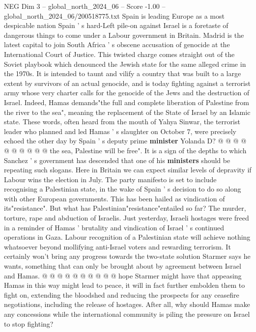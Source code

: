 \begin{textsample}{NEG Dim 3 – global\_north\_2024\_06 – Score -1.00 – global\_north\_2024\_06/200518775.txt}  \label{ex:f3_neg_394}
Spain is leading Europe as a most despicable nation Spain ' s hard-Left pile-on against Israel is a foretaste of dangerous things to come under a Labour government in Britain.
Madrid is the latest capital to join South Africa ' s obscene accusation of genocide at the International Court of Justice.
This twisted charge comes straight out of the Soviet playbook which denounced the Jewish state for the same alleged crime in the 1970s.
It is intended to taunt and vilify a country that was built to a large extent by survivors of an actual genocide, and is today fighting against a terrorist army whose very charter calls for the genocide of the Jews and the destruction of Israel.
Indeed, Hamas demands"the full and complete liberation of Palestine from the river to the sea", meaning the replacement of the State of Israel by an Islamic state.
These words, often heard from the mouth of Yahya Sinwar, the terrorist leader who planned and led Hamas ' s slaughter on October 7, were precisely echoed the other day by Spain ' s deputy prime \textbf{minister} Yolanda D? @ @ @ @ @ @ @ @ @ @ the sea, Palestine will be free".
It is a sign of the depths to which Sanchez ' s government has descended that one of his \textbf{ministers} should be repeating such slogans.
Here in Britain we can expect similar levels of depravity if Labour wins the election in July.
The party manifesto is set to include recognising a Palestinian state, in the wake of Spain ' s decision to do so along with other European governments.
This has been hailed as vindication of its"resistance".
But what has Palestinian"resistance"entailed so far?
The murder, torture, rape and abduction of Israelis.
Just yesterday, Israeli hostages were freed in a reminder of Hamas ' brutality and vindication of Israel ' s continued operations in Gaza.
Labour recognition of a Palestinian state will achieve nothing whatsoever beyond mollifying anti-Israel voters and rewarding terrorism.
It certainly won't bring any progress towards the two-state solution Starmer says he wants, something that can only be brought about by agreement between Israel and Hamas. @ @ @ @ @ @ @ @ @ @ hope Starmer might have that appeasing Hamas in this way might lead to peace, it will in fact further embolden them to fight on, extending the bloodshed and reducing the prospects for any ceasefire negotiations, including the release of hostages.
After all, why should Hamas make any concessions while the international community is piling the pressure on Israel to stop fighting?

\end{textsample}
